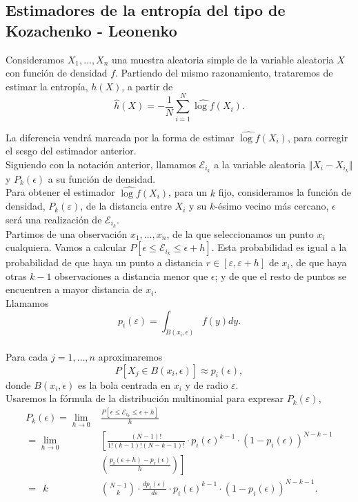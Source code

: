 \documentclass[12pt,a4paper]{report} %
\theoremstyle{definition}
\begin{document}
\subsection{Estimadores de la entropía del tipo de Kozachenko - Leonenko}

Consideramos $X_1,\dots, X_n$ una muestra aleatoria simple de la variable aleatoria $X$ con función de densidad $f$. Partiendo del mismo razonamiento, trataremos de estimar la entropía, $h(X)$, a partir de \[
\widehat{h}(X) = -\frac{1}{N}\sum_{i=1}^N\widehat{\log f}(X_i).\]

La diferencia vendrá marcada por la forma de estimar $\widehat{\log f}(X_i)$, para corregir el sesgo del estimador anterior.\\

Siguiendo con la notación anterior, llamamos $\mathcal{E}_{i_k}$ a la variable aleatoria $\Vert X_i - X_{i_k} \Vert$ y $P_k(\epsilon)$ a su función de densidad.\\

Para obtener el estimador $\widehat{\log f}(X_i)$, para un $k$ fijo, consideramos la función de densidad, $P_k(\varepsilon)$, de la distancia entre $X_i$ y su $k$-ésimo vecino más cercano, $\epsilon$ será una realización de $\mathcal{E}_{i_k}$.\\

Partimos de una observación $x_1,\dots, x_n$, de la que seleccionamos un punto $x_i$ cualquiera. Vamos a calcular $P\left[\epsilon \leq \mathcal{E}_{i_k} \leq \epsilon + h \right]$. Esta probabilidad es igual a la probabilidad de que haya un punto a distancia $r\in \left[ \varepsilon,\varepsilon + h \right ]$ de $x_i$, de que haya otras $k-1$ observaciones a distancia menor que $\epsilon$; y de que el resto de puntos se encuentren a mayor distancia de $x_i$.\\

Llamamos \[
p_i(\varepsilon) = \int_{B(x_i,\epsilon)}f(y)dy.
\]\\[-10pt]

Para cada $j = 1,\dots,n$ aproximaremos\[
P\left[X_j \in B(x_i,\epsilon)\right]\approx p_i(\epsilon),
\]donde $B(x_i,\epsilon)$ es la bola centrada en $x_i$ y de radio $\varepsilon$.\\

Usaremos la fórmula de la distribución multinomial para expresar $P_k(\varepsilon)$,
\begin{align*}
  P_k(\epsilon) = \lim_{h\to 0}&\frac{P\left[\epsilon \leq \mathcal{E}_{i_k} \leq \epsilon + h\right]}{h}\\[5pt] = \lim_{h\to 0}& \left [\frac{(N-1)!}{1!(k-1)!(N-k-1)!}  \cdot p_i(\epsilon)^{k-1} \cdot \left(1-p_i(\epsilon)\right)^{N-k-1} \right.\\[3pt] &\left.\left(\frac{p_i(\epsilon + h ) - p_i(\epsilon)}{h}\right)\right ]\\[5pt] = \ \  k\ \ &\binom{N-1}{k} \cdot \frac{d p_i(\varepsilon)}{d\varepsilon} \cdot p_i(\epsilon)^{k-1} \cdot \left(1-p_i(\epsilon)\right)^{N-k-1}.\\[-5pt]
\end{align*}
\end{document}
